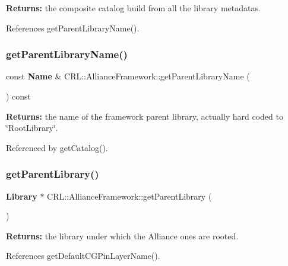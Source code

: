 {\bfseries Returns\+:} the composite catalog build from all the library metadatas. 

References get\+Parent\+Library\+Name().

\mbox{\label{classCRL_1_1AllianceFramework_a4f1d2d34c254ac596e8c4a408ef6ba43}} 
\subsubsection{\texorpdfstring{get\+Parent\+Library\+Name()}{getParentLibraryName()}}
{\footnotesize\ttfamily const \textbf{ Name} \& C\+R\+L\+::\+Alliance\+Framework\+::get\+Parent\+Library\+Name (\begin{DoxyParamCaption}{ }\end{DoxyParamCaption}) const\hspace{0.3cm}{\ttfamily [inline]}}

{\bfseries Returns\+:} the name of the framework parent library, actually hard coded to \char`\"{}\+Root\+Library\char`\"{}. 

Referenced by get\+Catalog().

\mbox{\label{classCRL_1_1AllianceFramework_afe822e9e04b613862aec5066743e1ffd}} 
\subsubsection{\texorpdfstring{get\+Parent\+Library()}{getParentLibrary()}}
{\footnotesize\ttfamily \textbf{ Library} $\ast$ C\+R\+L\+::\+Alliance\+Framework\+::get\+Parent\+Library (\begin{DoxyParamCaption}{ }\end{DoxyParamCaption})\hspace{0.3cm}{\ttfamily [inline]}}

{\bfseries Returns\+:} the library under which the Alliance ones are rooted. 

References get\+Default\+C\+G\+Pin\+Layer\+Name().

